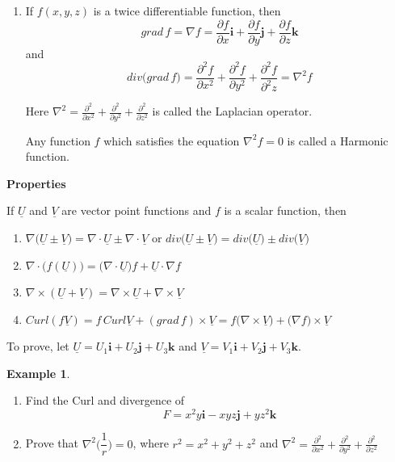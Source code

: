 \documentclass[11pt,a4paper]{article}
\theoremstyle{definition}
\newtheorem{exa}[thm]{Example}
\newcommand{\subhead}[1]{%
  \par\medskip\noindent\textbf{#1}\par\nobreak\smallskip}
\begin{document}
\begin{enumerate}
\item If $f(x,y,z)$ is a twice differentiable function, then $$grad\, f = \nabla f = \frac{\partial f}{\partial x}\textbf{i} + \frac{\partial f}{\partial y}\textbf{j} + \frac{\partial f}{\partial z}\textbf{k}$$ and $$div\big(grad\, f\big) = \frac{\partial^2 f}{\partial x^2} + \frac{\partial^2 f}{\partial y^2}+ \frac{\partial^2f}{\partial^2z} = \nabla^2f$$

Here $\displaystyle{\nabla^2 = \frac{\partial^2}{\partial x^2}+ \frac{\partial^2}{\partial y^2} + \frac{\partial^2}{\partial z^2}}$ is called the Laplacian operator.

Any function $f$  which satisfies the equation $\nabla^2f=0$ is called a Harmonic function.
\end{enumerate}

\pagebreak
\subhead{Properties}


If $\underline{U}$ and $\underline{V}$ are vector point functions and $f$ is a scalar function, then
\begin{enumerate}
\item $\nabla \big(\underline{U}\pm \underline{V}\big) = \nabla \cdot \underline{U} \pm \nabla \cdot \underline{V}$ or $div\big(\underline{U}\pm \underline{V}\big) = div\big(\underline{U}\big) \pm div\big(\underline{V}\big)$

\item $\nabla \cdot \Big(f(\underline{U})\Big) = \Big(\nabla\cdot \underline{U}\Big)f + \underline{U}\cdot \nabla f$

\item $\nabla\times (\underline{U}+\underline{V}) = \nabla\times\underline{U} + \nabla\times \underline{V}$

\item $Curl (f\underline{V}) = f\, Curl \underline{V} + (grad\, f)\times \underline{V} = f(\nabla \times \underline{V}\big) + \big(\nabla f\big)\times \underline{V}$
\end{enumerate}

To prove, let $\underline{U} = U_1\textbf{i} + U_2\textbf{j} + U_3\textbf{k}$ and $\underline{V} = V_1\textbf{i} + V_2\textbf{j} + V_3\textbf{k}$.


\begin{exa}
\begin{enumerate}
\item Find the Curl and divergence of $$F = x^2y\textbf{i} - xyz\textbf{j} + yz^2\textbf{k}$$
\item Prove that $\nabla^2\bigg(\dfrac{1}{r}\bigg) = 0$, where $ r^2 = x^2 + y^2 + z^2$ and $\displaystyle{\nabla^2 = \frac{\partial^2}{\partial x^2} + \frac{\partial^2}{\partial y^2} + \frac{\partial^2}{\partial z^2}}$
\end{enumerate}
\end{exa}
\end{document}
